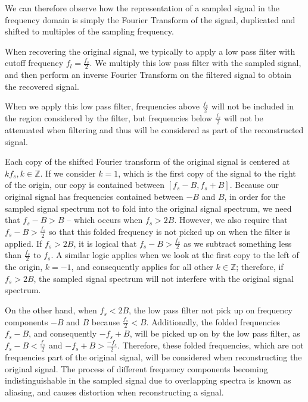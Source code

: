 \documentclass{article}
\begin{document}
We can therefore observe how the representation of a sampled signal in the frequency domain is simply the Fourier Transform of the signal, duplicated and shifted to multiples of the sampling frequency.

When recovering the original signal, we typically to apply a low pass filter with cutoff frequency $f_l = \frac{f_s}{2}$. 
We multiply this low pass filter with the sampled signal, and then perform an inverse Fourier Transform on the filtered signal to obtain the recovered signal.

\noindent When we apply this low pass filter, frequencies above $\frac{f_s}{2}$ will not be included in the region considered by the filter, but frequencies below $\frac{f_s}{2}$ will not be attenuated when filtering and thus will be considered as part of the reconstructed signal.

\noindent Each copy of the shifted Fourier transform of the original signal is centered at $kf_s, k \in \mathbb{Z}$. 
If we consider $k=1$, which is the first copy of the signal to the right of the origin, our copy is contained between $[f_s - B, f_s + B]$.
Because our original signal has frequencies contained between $-B$ and $B$, in order for the sampled signal spectrum not to fold into the original signal spectrum, we need that $f_s - B > B$ -- which occurs when $f_s > 2B$.
However, we also require that $f_s - B > \frac{f_s}{2}$ so that this folded frequency is not picked up on when the filter is applied.
If $f_s > 2B$, it is logical that $f_s - B > \frac{f_s}{2}$ as we subtract something less than $\frac{f_s}{2}$ to $f_s$.
A similar logic applies when we look at the first copy to the left of the origin, $k=-1$, and consequently applies for all other $k \in \mathbb{Z}$; therefore, if $f_s > 2B$, the sampled signal spectrum will not interfere with the original signal spectrum.

On the other hand, when $f_s < 2B$, the low pass filter not pick up on frequency components $-B$ and $B$ because $\frac{f_s}{2} < B$.
Additionally, the folded frequencies $f_s - B$, and consequently $-f_s + B$, will be picked up on by the low pass filter, as $f_s - B < \frac{f_s}{2}$ and $-f_s + B > \frac{-f_s}{2}$.
Therefore, these folded frequencies, which are not frequencies part of the original signal, will be considered when reconstructing the original signal.
The process of different frequency components becoming indistinguishable in the sampled signal due to overlapping spectra is known as aliasing, and causes distortion when reconstructing a signal.
\end{document}
